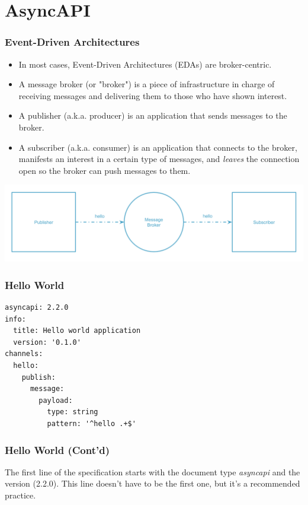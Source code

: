 \documentclass{efd-lecture}
\begin{document}
\section{AsyncAPI}

\begin{frame}
  \frametitle{Event-Driven Architectures}
  \begin{itemize}
    \item In most cases, Event-Driven Architectures (EDAs) are broker-centric.
    \item A message broker (or "broker") is a piece of infrastructure in charge of receiving messages and delivering them to those who have shown interest.
    \item A publisher (a.k.a. producer) is an application that sends messages to the broker.
    \item A subscriber (a.k.a. consumer) is an application that connects to the broker, manifests an interest in a certain type of messages,
      and \textit{\color{YellowOrange}leaves} the connection open so the broker can push messages to them.
  \end{itemize}
  \includegraphics[width=\textwidth]{./img/simple-event-driven.png}
\end{frame}

\begin{frame}[fragile]
  \frametitle{Hello World}
  \begin{verbatim}
asyncapi: 2.2.0
info:
  title: Hello world application
  version: '0.1.0'
channels:
  hello:
    publish:
      message:
        payload:
          type: string
          pattern: '^hello .+$'
  \end{verbatim}
\end{frame}

\begin{frame}[fragile]
  \frametitle{Hello World (Cont'd)}
  \begin{block}{}
    The first line of the specification starts with the document type \textit{\color{YellowOrange} asyncapi} and the version (2.2.0).
    This line doesn't have to be the first one,
    but it's a recommended practice.
  \end{block}
\end{frame}
\end{document}
